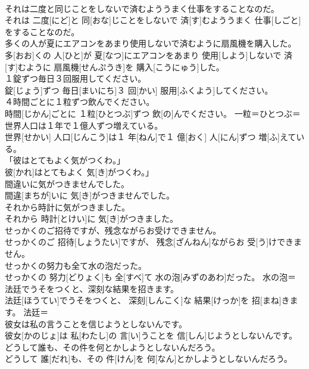 \documentclass[8pt]{extreport}
\begin{document}
\begin{CJK}{UTF8}{min}
\\	それは二度と同じことをしないで済むよううまく仕事をすることなのだ。	
\\	それは 二度[にど]と 同[おな]じことをしないで 済[す]むよううまく 仕事[しごと]をすることなのだ。	
\\	多くの人が夏にエアコンをあまり使用しないで済むように扇風機を購入した。	
\\	多[おお]くの 人[ひと]が 夏[なつ]にエアコンをあまり 使用[しよう]しないで 済[す]むように 扇風機[せんぷうき]を 購入[こうにゅう]した。	
\\	１錠ずつ毎日３回服用してください。	
\\	錠[じょう]ずつ 毎日[まいにち]３ 回[かい] 服用[ふくよう]してください。	
\\	４時間ごとに１粒ずつ飲んでください。	
\\	時間[じかん]ごとに １粒[ひとつぶ]ずつ 飲[の]んでください。	一粒＝ひとつぶ＝ 
\\	世界人口は１年で１億人ずつ増えている。	
\\	世界[せかい] 人口[じんこう]は１ 年[ねん]で１ 億[おく] 人[にん]ずつ 増[ふ]えている。	
\\	「彼はとてもよく気がつくわ。」	
\\	彼[かれ]はとてもよく 気[き]がつくわ。」	
\\	間違いに気がつきませんでした。	
\\	間違[まちが]いに 気[き]がつきませんでした。	
\\	それから時計に気がつきました。	
\\	それから 時計[とけい]に 気[き]がつきました。	
\\	せっかくのご招待ですが、残念ながらお受けできません。	
\\	せっかくのご 招待[しょうたい]ですが、 残念[ざんねん]ながらお 受[う]けできません。	
\\	せっかくの努力も全て水の泡だった。	
\\	せっかくの 努力[どりょく]も 全[すべ]て 水の泡[みずのあわ]だった。	水の泡＝ 
\\	法廷でうそをつくと、深刻な結果を招きます。	
\\	法廷[ほうてい]でうそをつくと、 深刻[しんこく]な 結果[けっか]を 招[まね]きます。	法廷＝ 
\\	彼女は私の言うことを信じようとしないんです。	
\\	彼女[かのじょ]は 私[わたし]の 言[い]うことを 信[しん]じようとしないんです。	
\\	どうして誰も、その件を何とかしようとしないんだろう。	
\\	どうして 誰[だれ]も、その 件[けん]を 何[なん]とかしようとしないんだろう。	

\end{CJK}
\end{document}
